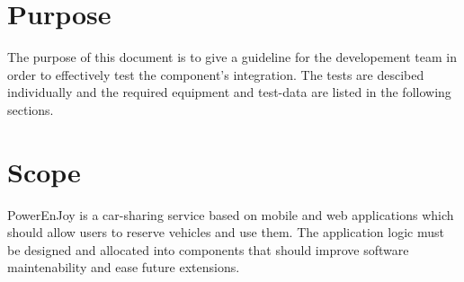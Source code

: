 \section{Purpose}
The purpose of this document is to give a guideline for the developement team in order to effectively test the component's integration.
The tests are descibed individually and the required equipment and test-data are listed in the following sections.

\section{Scope}
PowerEnJoy is a car-sharing service based on mobile and web applications which should allow users to reserve vehicles and use them.
The application logic must be designed and allocated into components that should improve software maintenability and ease future extensions.